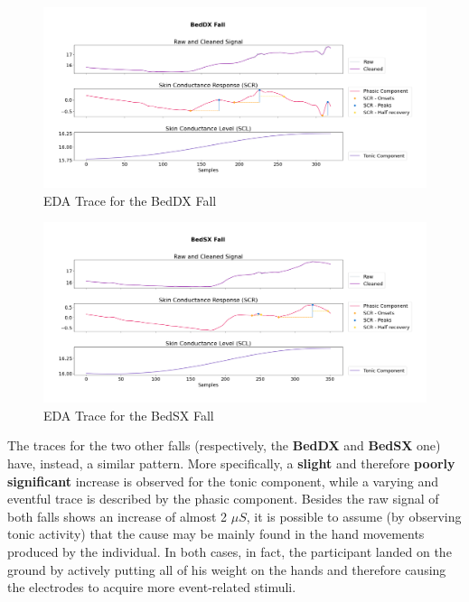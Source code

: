 \begin{figure}[H]
    \centering
    \includegraphics[width=\textwidth]{./images/movisens/BedDX.png}
    \caption{EDA Trace for the BedDX Fall}
    \label{fig:movisens-beddx}
\end{figure}

\begin{figure}[H]
    \centering
    \includegraphics[width=\textwidth]{./images/movisens/BedSX.png}
    \caption{EDA Trace for the BedSX Fall}
    \label{fig:movisens-bedsx}
\end{figure}

The traces for the two other falls (respectively, the \textbf{BedDX} and \textbf{BedSX} one) have, instead, a similar pattern. More specifically, a \textbf{slight} and therefore \textbf{poorly significant} increase is observed for the tonic component, while a varying and eventful trace is described by the phasic component. Besides the raw signal of both falls shows an increase of almost 2 $\mu S$, it is possible to assume (by observing tonic activity) that the cause may be mainly found in the hand movements produced by the individual. In both cases, in fact, the participant landed on the ground by actively putting all of his weight on the hands and therefore causing the electrodes to acquire more event-related stimuli.


